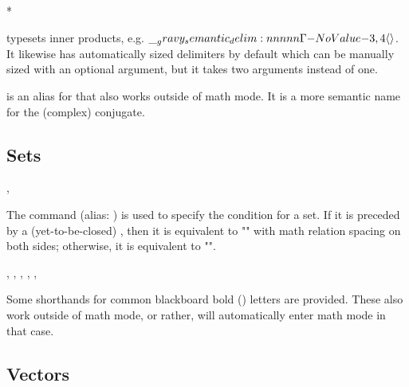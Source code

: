 \documentclass{l3doc}
\begin{document}
\begin{function}{\innerp}
  \begin{syntax}
     *   
  \end{syntax}

   typesets inner products, e.g. $\innerp{3}{4}$. It likewise has automatically sized delimiters by default which can be manually sized with an optional argument, but it takes two arguments instead of one.
\end{function}

\begin{function}{\conj}
  \begin{syntax}
     
  \end{syntax}

   is an alias for  that also works outside of math mode. It is a more semantic name for the (complex) conjugate.
\end{function}

\subsection{Sets}

\begin{function}{\given, \suchthat}
  \begin{syntax}
  \end{syntax}

  The  command (alias: ) is used to specify the condition for a set. If it is preceded by a (yet-to-be-closed) , then it is equivalent to "\middle\vert" with math relation spacing on both sides; otherwise, it is equivalent to "\mid".
\end{function}

\begin{function}{\RR, \CC, \NN, \FF, \QQ, \ZZ}
  \begin{syntax}
  \end{syntax}

  Some shorthands for common blackboard bold () letters are provided. These also work outside of math mode, or rather, will automatically enter math mode in that case.
\end{function}

\subsection{Vectors}
\end{document}
